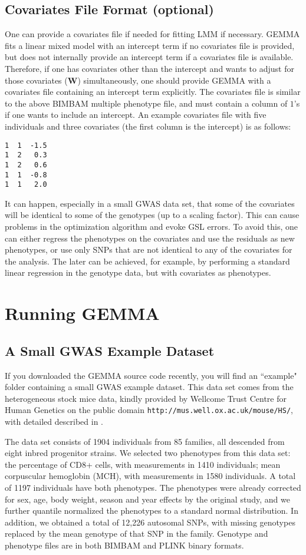 \documentclass[11pt]{article}
\providecommand{\url}[1]{\texttt{#1}}
\begin{document}
\subsection{Covariates File Format (optional)}
One can provide a covariates file if needed for fitting LMM if necessary. GEMMA fits a linear mixed model with an intercept term if no covariates file is provided, but does not internally provide an intercept term if a covariates file is available. Therefore, if one has covariates other than the intercept and wants to adjust for those covariates ($\mathbf W$) simultaneously, one should provide GEMMA with a covariates file containing an intercept term explicitly. The covariates file is similar to the above BIMBAM  multiple phenotype file, and must contain a column of $1$'s if one wants to include an intercept. An example covariates file with five individuals and three covariates (the first column is the intercept) is as follows:
%
\begin{verbatim}
1  1  -1.5
1  2   0.3
1  2   0.6
1  1  -0.8
1  1   2.0
\end{verbatim}
%
It can happen, especially in a small GWAS data set, that some of the covariates will be identical to some of the genotypes (up to a scaling factor). This can cause problems in the optimization algorithm and evoke GSL errors. To avoid this, one can either regress the phenotypes on the covariates and use the residuals as new phenotypes, or use only SNPs that are not identical to any of the covariates for the analysis. The later can be achieved, for example, by performing a standard linear regression in the genotype data, but with covariates as phenotypes.




\newpage
\section{Running GEMMA}

\subsection{A Small GWAS Example Dataset}
If you downloaded the GEMMA source code recently, you will find an ``example" folder containing a small GWAS example dataset. This data set comes from the heterogeneous stock mice data, kindly provided by Wellcome Trust Centre for Human Genetics on the public domain \url{http://mus.well.ox.ac.uk/mouse/HS/}, with detailed described in \cite{Valdar:2006}. 

The data set consists of 1904 individuals from 85 families, all descended from eight inbred progenitor strains. We selected two phenotypes from this data set: the percentage of CD8+ cells, with measurements in 1410 individuals; mean corpuscular hemoglobin (MCH), with measurements in 1580 individuals. A total of 1197 individuals have both phenotypes. The phenotypes were already corrected for sex, age, body weight, season and year effects by the original study, and we further quantile normalized the phenotypes to a standard normal distribution. In addition, we obtained a total of 12,226 autosomal SNPs, with missing genotypes replaced by the mean genotype of that SNP in the family. Genotype and phenotype files are in both BIMBAM and PLINK binary formats. 
\end{document}
